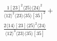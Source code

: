 \documentclass[varwidth, border=5pt]{standalone}
\begin{document}
\begin{my}
$\begin{gathered}
\scriptscriptstyle\frac{1[23]^2⟨25⟩⟨24⟩^2}{⟨12⟩^2⟨23⟩⟨35⟩[35]^2}+\\
\scriptscriptstyle\frac{2⟨14⟩[23]⟨25⟩^2⟨24⟩}{⟨12⟩^3⟨23⟩⟨35⟩[35]}\phantom{+}
\end{gathered}$
\end{my}
\end{document}
